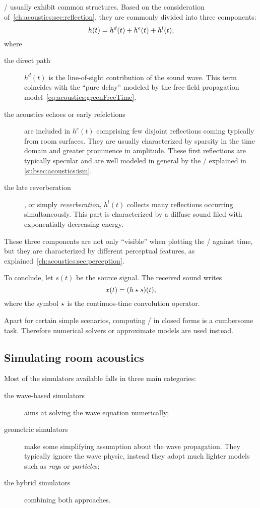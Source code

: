 \RIRs/ usually exhibit common structures.
Based on the consideration of~\cref{ch:acoustics:sec:reflection}, they are commonly divided into three components:
\begin{equation}\label{eq:acoustics:rir_full}
h(t) = h^d(t) + h^e(t) + h^l(t)
,
\end{equation}
where
\begin{description}
    \item[the direct path] $h^d(t)$ is the line-of-sight contribution of the sound wave.
    This term coincides with the ``pure delay'' modeled by the free-field propagation model~\eqref{eq:acoustics:greenFreeTime}.
    \item[the acoustics echoes or early refelctions] are included in $h^e(t)$ comprising few disjoint reflections coming typically from room surfaces.
    They are usually characterized by sparsity in the time domain and greater prominence in amplitude.
    These first reflections are typically specular and are well modeled in general by the \ISMdef/ explained in \cref{subsec:acoustics:ism}.
    \item[the late reverberation], or simply \textit{reverberation}, $h^l(t)$ collects many reflections occurring simultaneously.
    This part is characterized by a diffuse sound filed with exponentially decreasing energy.
\end{description}
These three components are not only ``visible'' when plotting the \RIR/ against time,
but they are characterized by different perceptual features, as explained~\cref{ch:acoustics:sec:perception}.

To conclude, let $s(t)$ be the source signal. The received sound writes
\begin{equation}
    x(t) = (h \star s)(t)
    ,
\end{equation}
where the symbol $\star$ is the continuos-time convolution operator.

Apart for certain simple scenarios, computing \RIRs/ in closed forms is a cumbersome task.
Therefore numerical solvers or approximate models are used instead.

\subsection{Simulating room acoustics}\label{sec:acoustics:simulators}
Most of the simulators available falls in three main categories:
\begin{description}
    \item[the wave-based simulators] aims at solving the wave equation numerically;
    \item[geometric simulators] make some simplifying assumption about the wave propagation.
    They typically ignore the wave physic, instead they adopt much lighter models such as \textit{ray}s or \textit{particle}s;
    \item[the hybrid simulators] combining both approaches.
\end{description}

